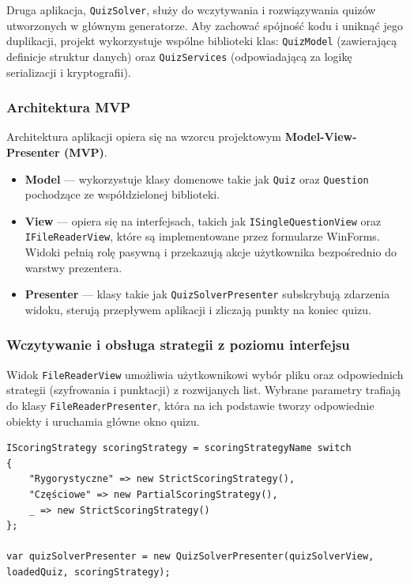 \documentclass[12pt,a4paper]{article}
\begin{document}
Druga aplikacja, \texttt{QuizSolver}, służy do wczytywania i rozwiązywania quizów utworzonych w głównym generatorze. Aby zachować spójność kodu i uniknąć jego duplikacji, projekt wykorzystuje wspólne biblioteki klas: \texttt{QuizModel} (zawierającą definicje struktur danych) oraz \texttt{QuizServices} (odpowiadającą za logikę serializacji i kryptografii).

\subsubsection{Architektura MVP}
Architektura aplikacji opiera się na wzorcu projektowym \textbf{Model-View-Presenter (MVP)}.
\begin{itemize}
    \item \textbf{Model} --- wykorzystuje klasy domenowe takie jak \texttt{Quiz} oraz \texttt{Question} pochodzące ze współdzielonej biblioteki.
    \item \textbf{View} --- opiera się na interfejsach, takich jak \texttt{ISingleQuestionView} oraz \texttt{IFileReaderView}, które są implementowane przez formularze WinForms. Widoki pełnią rolę pasywną i przekazują akcje użytkownika bezpośrednio do warstwy prezentera.
    \item \textbf{Presenter} --- klasy takie jak \texttt{QuizSolverPresenter} subskrybują zdarzenia widoku, sterują przepływem aplikacji i zliczają punkty na koniec quizu.
\end{itemize}

\subsubsection{Wczytywanie i obsługa strategii z poziomu interfejsu}
Widok \texttt{FileReaderView} umożliwia użytkownikowi wybór pliku oraz odpowiednich strategii (szyfrowania i punktacji) z rozwijanych list. Wybrane parametry trafiają do klasy \texttt{FileReaderPresenter}, która na ich podstawie tworzy odpowiednie obiekty i uruchamia główne okno quizu.

\begin{lstlisting}[caption={Wybór strategii oceniania i uruchomienie quizu w FileReaderPresenter}]
IScoringStrategy scoringStrategy = scoringStrategyName switch
{
    "Rygorystyczne" => new StrictScoringStrategy(),
    "Częściowe" => new PartialScoringStrategy(),
    _ => new StrictScoringStrategy()
};

var quizSolverPresenter = new QuizSolverPresenter(quizSolverView, loadedQuiz, scoringStrategy);
\end{lstlisting}
\end{document}
